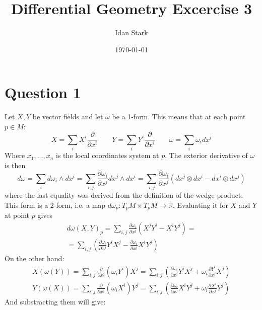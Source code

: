 \documentclass{article}
\title{Differential Geometry Excercise 3}
\author{Idan Stark}
\date{\today}
\newcommand{\R}{\ensuremath{\mathbb{R}}}
\begin{document}
\maketitle

\section*{Question 1}
Let $X, Y$ be vector fields and let $\omega$ be a 1-form. This means that at each point $p \in M$:
\begin{equation}
    X = \sum_i X^i \frac{\partial}{\partial x^i}
    \qquad
    Y = \sum_i Y^i \frac{\partial}{\partial x^i}
    \qquad
    \omega = \sum_i \omega_i dx^i
\end{equation}
Where $x_1, ..., x_n$ is the local coordinates system at $p$. The exterior derivative of $\omega$ is then
\begin{equation}
    d\omega = \sum_{i} d\omega_i \wedge dx^i = \sum_{i, j} \frac{\partial \omega_i}{\partial x^j} dx^j \wedge dx^i = \sum_{i, j} \frac{\partial \omega_i}{\partial x^j} \left(dx^j \otimes dx^i - dx^i \otimes dx^j\right)
\end{equation}
where the last equality was derived from the definition of the wedge product. This form is a 2-form, i.e. a map $d\omega_p: T_p M \times T_p M \rightarrow \R$. Evaluating it for $X$ and $Y$ at point $p$ gives
\begin{equation}
\begin{gathered}
    d\omega(X, Y)_p = \sum_{i, j} \frac{\partial \omega_i}{\partial x^j} \left(X^jY^i - X^iY^j\right) = \\ =
    \sum_{i, j}\left(\frac{\partial \omega_i}{\partial x^j} Y^i X^j - \frac{\partial \omega_i}{\partial x^j} X^iY^j \right)
\end{gathered}
\end{equation}
On the other hand:
\begin{equation}
\begin{gathered}
    X(\omega(Y)) = \sum_{i, j}\frac{\partial }{\partial x^j} (\omega_iY^i) X^j = \sum_{i, j}\left(\frac{\partial \omega_i}{\partial x^j} Y^i X^j + \omega_i\frac{\partial Y^i}{\partial x^j} X^j \right)
    \\
    Y(\omega(X)) = \sum_{i, j}\frac{\partial}{\partial x^j} (\omega_iX^i) Y^j = \sum_{i, j} \left(\frac{\partial \omega_i}{\partial x^j} X^i Y^j + \omega_i\frac{\partial X^i}{\partial x^j} Y^j\right)
\end{gathered}
\end{equation}
And substracting them will give:
\end{document}
